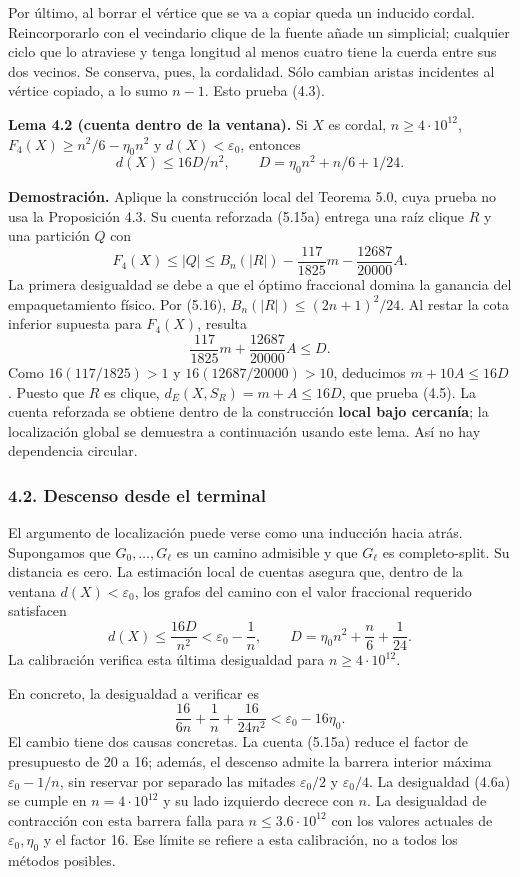 \documentclass[spanish,11pt,a4paper]{article}
\begin{document}
Por último, al borrar el vértice que se va a copiar queda un inducido cordal. Reincorporarlo con el vecindario clique de la fuente añade un simplicial; cualquier ciclo que lo atraviese y tenga longitud al menos cuatro tiene la cuerda entre sus dos vecinos. Se conserva, pues, la cordalidad. Sólo cambian aristas incidentes al vértice copiado, a lo sumo \(n-1\). Esto prueba (4.3).


\textbf{Lema 4.2 (cuenta dentro de la ventana).} Si \(X\) es cordal, \(n\ge4\cdot10^{12}\), \(F_4(X)\ge n^2/6-\eta_0n^2\) y \(d(X)<\varepsilon_0\), entonces \[
d(X)\le16D/n^2,\qquad D=\eta_0n^2+n/6+1/24.
\tag{4.5}
\]

\textbf{Demostración.} Aplique la construcción local del Teorema 5.0, cuya prueba no usa la Proposición 4.3. Su cuenta reforzada (5.15a) entrega una raíz clique \(R\) y una partición \(Q\) con \[
F_4(X)\le |Q|\le B_n(|R|)-\frac{117}{1825}m-\frac{12687}{20000}A.
\] La primera desigualdad se debe a que el óptimo fraccional domina la ganancia del empaquetamiento físico. Por (5.16), \(B_n(|R|)\le(2n+1)^2/24\). Al restar la cota inferior supuesta para \(F_4(X)\), resulta \[
\frac{117}{1825}m+\frac{12687}{20000}A\le D.
\] Como \(16(117/1825)>1\) y \(16(12687/20000)>10\), deducimos \(m+10A\le16D\). Puesto que \(R\) es clique, \(d_E(X,S_R)=m+A\le16D\), que prueba (4.5). La cuenta reforzada se obtiene dentro de la construcción \textbf{local bajo cercanía}; la localización global se demuestra a continuación usando este lema. Así no hay dependencia circular.

\subsubsection{4.2. Descenso desde el terminal}\label{descenso-desde-el-terminal}

El argumento de localización puede verse como una inducción hacia atrás. Supongamos que \(G_0,\ldots,G_\ell\) es un camino admisible y que \(G_\ell\) es completo-split. Su distancia es cero. La estimación local de cuentas asegura que, dentro de la ventana \(d(X)<\varepsilon_0\), los grafos del camino con el valor fraccional requerido satisfacen \[
d(X)\le\frac{16D}{n^2}<\varepsilon_0-\frac1n,\qquad
D=\eta_0n^2+\frac n6+\frac1{24}.
\tag{4.6}
\] La calibración verifica esta última desigualdad para \(n\ge4\cdot10^{12}\).

En concreto, la desigualdad a verificar es \[
\frac{16}{6n}+\frac1n+\frac{16}{24n^2}
<\varepsilon_0-16\eta_0.
\tag{4.6a}
\] El cambio tiene dos causas concretas. La cuenta (5.15a) reduce el factor de presupuesto de 20 a 16; además, el descenso admite la barrera interior máxima \(\varepsilon_0-1/n\), sin reservar por separado las mitades \(\varepsilon_0/2\) y \(\varepsilon_0/4\). La desigualdad (4.6a) se cumple en \(n=4\cdot10^{12}\) y su lado izquierdo decrece con \(n\). La desigualdad de contracción con esta barrera falla para \(n\le3.6\cdot10^{12}\) con los valores actuales de \(\varepsilon_0,\eta_0\) y el factor 16. Ese límite se refiere a esta calibración, no a todos los métodos posibles.
\end{document}
